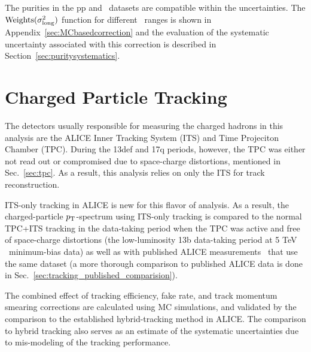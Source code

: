 The purities in the pp and \pPb~datasets are compatible within the uncertainties. The $\text{Weights}(\sigma^{2}_{\mathrm{long}})$ function for different \pt~ranges is shown in Appendix~\ref{sec:MCbasedcorrection} and the evaluation of the systematic uncertainty associated with this correction is described in Section~\ref{sec:puritysystematics}. 
\FloatBarrier



\section{Charged Particle Tracking}
\label{sec:tracking}
The detectors usually responsible for measuring the charged hadrons in this analysis are the ALICE Inner Tracking System (ITS) and Time Projeciton Chamber (TPC). During the 13def and 17q periods, however, the TPC was either not read out or compromised due to space-charge distortions, mentioned in Sec.~\ref{sec:tpc}. As a result, this analysis relies on only the ITS for track reconstruction.

ITS-only tracking in ALICE is new for this flavor of analysis. As a result, the charged-particle $p_{\mathrm{T}}$-spectrum using ITS-only tracking is compared to the normal TPC+ITS tracking in the data-taking period when the TPC was active and free of space-charge distortions (the low-luminosity 13b data-taking period at 5 TeV \pPb~minimum-bias data) as well as with published ALICE measurements~\cite{Acharya:2018qsh} that use the same dataset (a more thorough comparison to published ALICE data is done in Sec.~\ref{sec:tracking_published_comparision}).

The combined effect of tracking efficiency, fake rate, and track momentum smearing corrections are calculated using MC simulations, and validated by the comparison to the established hybrid-tracking method in ALICE. The comparison to hybrid tracking also serves as an estimate of the systematic uncertainties due to mis-modeling of the tracking performance.

